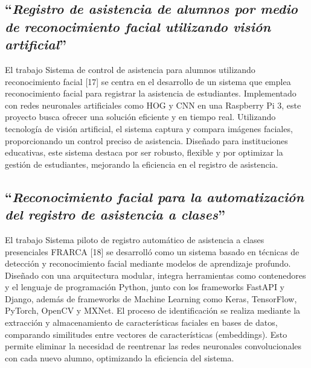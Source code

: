 \subsection{``\textit{Registro de asistencia de alumnos por medio de reconocimiento facial utilizando visión artificial}''}

El trabajo Sistema de control de asistencia para alumnos utilizando reconocimiento facial [17] se centra en el desarrollo de un sistema que emplea reconocimiento facial para registrar la asistencia de estudiantes. Implementado con redes neuronales artificiales como HOG y CNN en una Raspberry Pi 3, este proyecto busca ofrecer una solución eficiente y en tiempo real. Utilizando tecnología de visión artificial, el sistema captura y compara imágenes faciales, proporcionando un control preciso de asistencia. Diseñado para instituciones educativas, este sistema destaca por ser robusto, flexible y por optimizar la gestión de estudiantes, mejorando la eficiencia en el registro de asistencia.

\subsection{``\textit{Reconocimiento facial para la automatización del registro de asistencia a clases}''}


El trabajo Sistema piloto de registro automático de asistencia a clases presenciales FRARCA [18] se desarrolló como un sistema basado en técnicas de detección y reconocimiento facial mediante modelos de aprendizaje profundo. Diseñado con una arquitectura modular, integra herramientas como contenedores y el lenguaje de programación Python, junto con los frameworks FastAPI y Django, además de frameworks de Machine Learning como Keras, TensorFlow, PyTorch, OpenCV y MXNet. El proceso de identificación se realiza mediante la extracción y almacenamiento de características faciales en bases de datos, comparando similitudes entre vectores de características (embeddings). Esto permite eliminar la necesidad de reentrenar las redes neuronales convolucionales con cada nuevo alumno, optimizando la eficiencia del sistema.




















